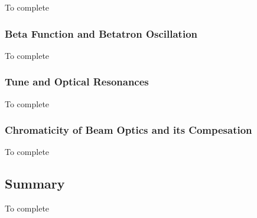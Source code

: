 To complete

\subsubsection{Beta Function and Betatron Oscillation} %

To complete

\subsubsection{Tune and Optical Resonances} %

To complete

\subsubsection{Chromaticity of Beam Optics and its Compesation} %

To complete

\subsection{Summary} %

To complete


  